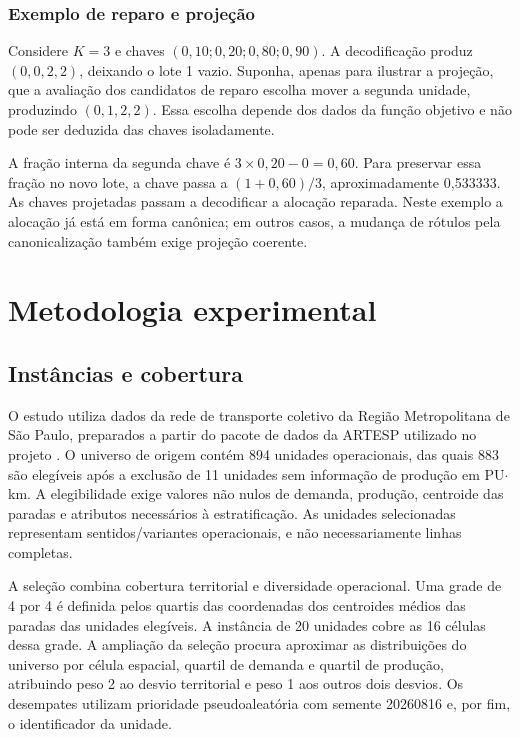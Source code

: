 \documentclass[12pt,a4paper]{article}
\begin{document}
\subsubsection*{Exemplo de reparo e projeção}

Considere $K=3$ e chaves \((0{,}10;0{,}20;0{,}80;0{,}90)\). A decodificação produz
\((0,0,2,2)\), deixando o lote 1 vazio. Suponha, apenas para ilustrar a projeção, que a
avaliação dos candidatos de reparo escolha mover a segunda unidade, produzindo
\((0,1,2,2)\). Essa escolha depende dos dados da função objetivo e não pode ser deduzida
das chaves isoladamente.

A fração interna da segunda chave é \(3\times0{,}20-0=0{,}60\). Para preservar essa
fração no novo lote, a chave passa a \((1+0{,}60)/3\), aproximadamente 0,533333. As
chaves projetadas passam a decodificar a alocação reparada. Neste exemplo a alocação já
está em forma canônica; em outros casos, a mudança de rótulos pela canonicalização
também exige projeção coerente.

\section{Metodologia experimental}
\label{sec:metodologia}

\subsection{Instâncias e cobertura}
\label{subsec:instancias}

O estudo utiliza dados da rede de transporte coletivo da Região Metropolitana de São
Paulo, preparados a partir do pacote de dados da ARTESP utilizado no projeto \cite{pacoteartesp2026}. O universo
de origem contém 894 unidades operacionais, das quais 883 são elegíveis após a exclusão
de 11 unidades sem informação de produção em PU$\cdot$km. A elegibilidade exige valores
não nulos de demanda, produção, centroide das paradas e atributos necessários à
estratificação. As unidades selecionadas representam sentidos/variantes operacionais, e
não necessariamente linhas completas.

A seleção combina cobertura territorial e diversidade operacional. Uma grade de 4 por 4
é definida pelos quartis das coordenadas dos centroides médios das paradas das unidades
elegíveis. A instância de 20 unidades cobre as 16 células dessa grade. A ampliação da
seleção procura aproximar as distribuições do universo por célula espacial, quartil de
demanda e quartil de produção, atribuindo peso 2 ao desvio territorial e peso 1 aos
outros dois desvios. Os desempates utilizam prioridade pseudoaleatória com semente
20260816 e, por fim, o identificador da unidade.
\end{document}
